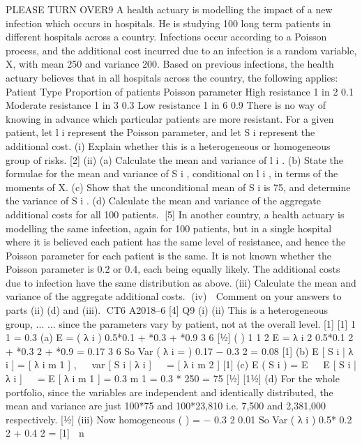 \documentclass[a4paper,12pt]{article}
\begin{document}
\begin{enumerate}
PLEASE TURN OVER9
A health actuary is modelling the impact of a new infection which occurs in hospitals.
He is studying 100 long term patients in different hospitals across a country.
Infections occur according to a Poisson process, and the additional cost incurred due
to an infection is a random variable, X, with mean 250 and variance 200.
Based on previous infections, the health actuary believes that in all hospitals across the country, the following applies:
Patient Type
Proportion of patients Poisson parameter
High resistance 1 in 2 0.1
Moderate resistance 1 in 3 0.3
Low resistance 1 in 6 0.9
There is no way of knowing in advance which particular patients are more resistant.
For a given patient, let l i represent the Poisson parameter, and let S i represent the additional cost.
(i) Explain whether this is a heterogeneous or homogeneous group of risks.
[2]
(ii) (a) Calculate the mean and variance of l i .
(b) State the formulae for the mean and variance of S i , conditional on l i , in terms of the moments of X.
(c) Show that the unconditional mean of S i is 75, and determine the
variance of S i .
(d)
Calculate the mean and variance of the aggregate additional costs for
all 100 patients.
[5]
In another country, a health actuary is modelling the same infection, again for 100 patients, but in a single hospital where it is believed each patient has the same level
of resistance, and hence the Poisson parameter for each patient is the same. It is not known whether the Poisson parameter is 0.2 or 0.4, each being equally likely. The
additional costs due to infection have the same distribution as above.
(iii) Calculate the mean and variance of the aggregate additional costs.
(iv)
 Comment on your answers to parts (ii) (d) and (iii).
CT6 A2018–6
[4]
Q9
(i)
(ii)
This is a heterogeneous group, ...
... since the parameters vary by patient, not at the overall level. [1]
[1]
1
1
= 0.3
(a) E =
( λ i ) 0.5*0.1 + *0.3 + *0.9
3
6 [1⁄2]
( )
1
1
2
E =
λ i 2 0.5*0.1 2 + *0.3 2 + *0.9
=
0.17
3
6
So Var ( λ i =
) 0.17 − 0.3 2 = 0.08 [1]
(b) E [ S i | λ i ] = [ λ i m 1 ] ,   var [ S i | λ i ]   =
[ λ i m 2 ] [1]
(c) E ( S i ) = E   E [ S i | λ i ]   = E [ λ i m 1 ] = 0.3 m 1 = 0.3 * 250 = 75 [1⁄2]
[11⁄2]
(d) For the whole portfolio, since the variables are independent and identically
distributed, the mean and variance are just 100*75 and 100*23,810 i.e. 7,500
and 2,381,000 respectively.
[1⁄2]
(iii)
Now homogeneous
(
)
=
− 0.3 2 0.01
So Var
( λ i ) 0.5* 0.2 2 + 0.4 2 = [1]
 n 

\end{enumerate}
\end{document}
